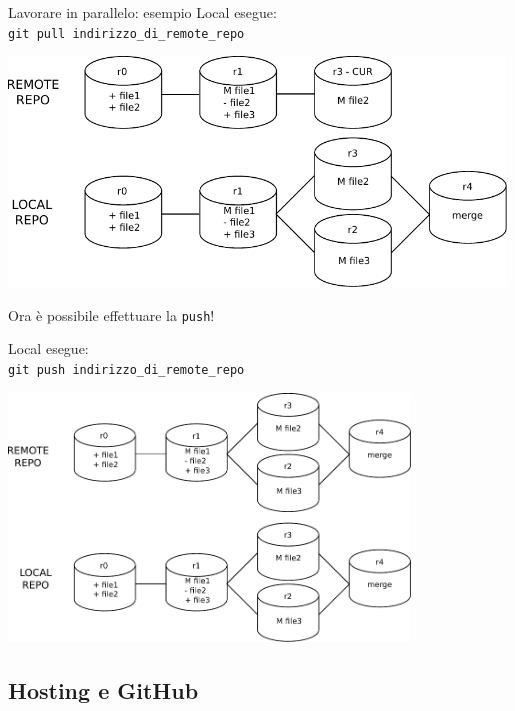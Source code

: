\documentclass[presentation]{beamer}
\begin{document}
\begin{frame}{Lavorare in parallelo: esempio}
	Local esegue:\\
	\texttt{git pull indirizzo\_di\_remote\_repo} \\
	\begin{center}
		\includegraphics[width=0.99\textwidth]{img/draw9}
	\end{center}
	Ora è possibile effettuare la \texttt{push}!
	\framebreak{}

	Local esegue:\\
	\texttt{git push indirizzo\_di\_remote\_repo} \\
	\begin{center}
		\includegraphics[width=0.8\textwidth]{img/draw10}
	\end{center}
\end{frame}

\subsection{Hosting e GitHub}

\end{document}
